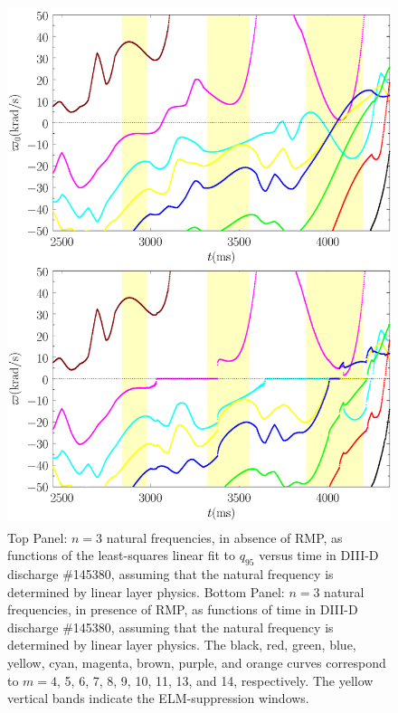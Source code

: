 \documentclass[12pt,prb,aps]{revtex4-1}
\begin{document}
\begin{figure}
\includegraphics[height=6in]{fig11.pdf}
\caption{Top Panel: $n=3$ natural frequencies, in absence of RMP, as functions of the least-squares linear fit to $q_{95}$ versus time
in   DIII-D discharge \#145380, assuming that the natural frequency is determined by linear layer physics.
Bottom Panel:  $n=3$ natural frequencies, in presence of RMP, as functions of time
in   DIII-D discharge \#145380, assuming that the natural frequency is determined by linear layer physics. The black, red, green, blue, yellow, cyan, magenta,  brown, 
purple, and orange curves correspond to $m=4$, 5, 6, 7, 8, 9, 10,  11, 13, and 14, respectively. The yellow vertical bands indicate the ELM-suppression windows.} \label{fig11}
\end{figure}
\end{document}
